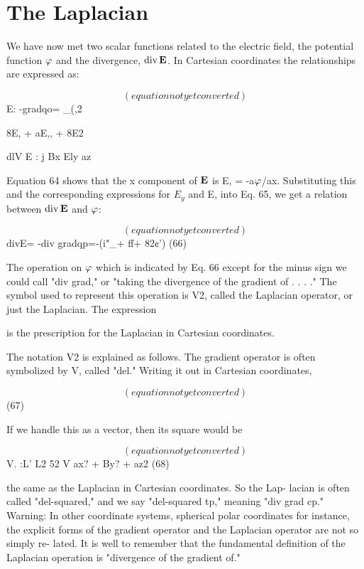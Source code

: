 \iffalse

\section{The Laplacian}

We have now met two scalar functions related to the electric field,
the potential function $\varphi$ and the divergence, $\operatorname{div}\mathbf{E}$. In Cartesian coordinates
the relationships are expressed as:

\begin{equation}
(equation not yet converted)
\end{equation}
E: -gradqo= _(,2%

8E, + aE,, + 8E2

dlV E : j
Bx Ely az

Equation 64 shows that the x component of $\mathbf{E}$ is E, = -a$\varphi$/ax.
Substituting this and the corresponding expressions for $E_y$ and E,
into Eq. 65, we get a relation between $\operatorname{div}\mathbf{E}$ and $\varphi$:

\begin{equation}
(equation not yet converted)
\end{equation}
divE= -div gradqp=-(i"_+ ff+ 82¢') (66)

The operation on $\varphi$ which is indicated by Eq. 66 except for the minus
sign we could call "div grad," or "taking the divergence of the
gradient of . . . ." The symbol used to represent this operation is V2,
called the Laplacian operator, or just the Laplacian. The expression

is the prescription for the Laplacian in Cartesian coordinates.

The notation V2 is explained as follows. The gradient operator is
often symbolized by V, called "del." Writing it out in Cartesian
coordinates,

\begin{equation}
(equation not yet converted)
\end{equation}
(67)

If we handle this as a vector, then its square would be

\begin{equation}
(equation not yet converted)
\end{equation}
V. :L' L2 52
V ax? + By? + az2 (68)

the same as the Laplacian in Cartesian coordinates. So the Lap-
lacian is often called "del-squared," and we say "del-squared tp,"
meaning "div grad cp." Warning: In other coordinate systems,
spherical polar coordinates for instance, the explicit forms of the
gradient operator and the Laplacian operator are not so simply re-
lated. It is well to remember that the fundamental definition of the
Laplacian operation is "divergence of the gradient of."

